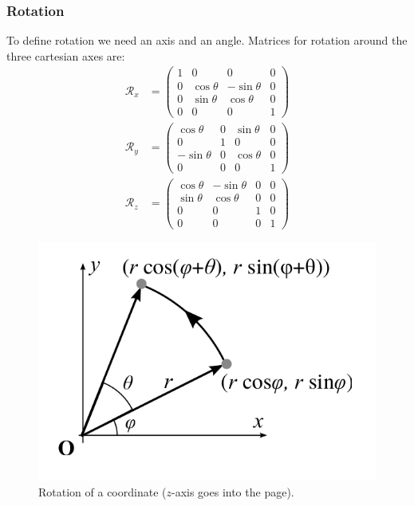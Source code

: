 \documentclass[11pt]{article}
\begin{document}
\subsubsection{Rotation}
To define rotation we need an axis and an angle.
Matrices for rotation around the three cartesian axes are:
\begin{align*}
  \mathcal{R}_x &=
  \begin{pmatrix}
    1 & 0 & 0 & 0 \\
    0 & \cos \theta & -\sin \theta & 0 \\
    0 & \sin \theta & \cos \theta & 0 \\
    0 & 0 & 0 & 1
  \end{pmatrix} \\
  \mathcal{R}_y &=
  \begin{pmatrix}
    \cos \theta & 0 & \sin \theta & 0 \\
    0 & 1 & 0 & 0 \\
    -\sin \theta & 0 & \cos \theta & 0 \\
    0 & 0 & 0 & 1
  \end{pmatrix} \\
  \mathcal{R}_z &=
  \begin{pmatrix}
    \cos \theta &  -\sin \theta & 0 & 0 \\
    \sin \theta & \cos \theta & 0 & 0 \\
    0 & 0 & 1 & 0 \\
    0 & 0 & 0 & 1
  \end{pmatrix}
\end{align*}

\begin{figure}[htb!]
  \caption{Rotation of a coordinate ($z$-axis goes into the page).}
  \includegraphics[scale=0.3]{deriverotate}
  \centering
\end{figure}
\end{document}
